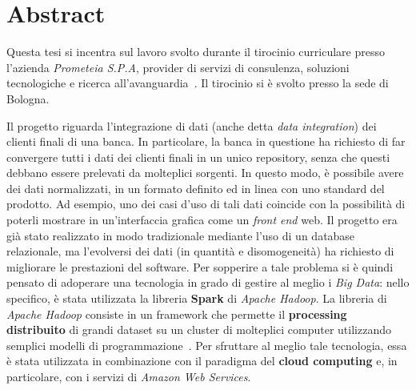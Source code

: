 \chapter*{Abstract}

Questa tesi si incentra sul lavoro svolto durante il tirocinio curriculare presso l'azienda \textit{Prometeia S.P.A}, provider di servizi di consulenza, soluzioni tecnologiche e ricerca all'avanguardia~\cite{Prometeia-aboutus}.
Il tirocinio si è svolto presso la sede di Bologna.

Il progetto riguarda l'integrazione di dati (anche detta \textit{data integration}) dei clienti finali di una banca.
In particolare, la banca in questione ha richiesto di far convergere tutti i dati dei clienti finali in un unico repository, senza che questi debbano essere prelevati da molteplici sorgenti.
In questo modo, è possibile avere dei dati normalizzati, in un formato definito ed in linea con uno standard del prodotto.
Ad esempio, uno dei casi d'uso di tali dati coincide con la possibilità di poterli mostrare in un'interfaccia grafica come un \textit{front end} web.
Il progetto era già stato realizzato in modo tradizionale mediante l'uso di un database relazionale, ma l'evolversi dei dati (in quantità e disomogeneità) ha richiesto di migliorare le prestazioni del software.
Per sopperire a tale problema si è quindi pensato di adoperare una tecnologia in grado di gestire al meglio i \textit{Big Data}: nello specifico, è stata utilizzata la libreria \textbf{Spark} di \textit{Apache Hadoop}.
La libreria di \textit{Apache Hadoop} consiste in un framework che permette il \textbf{processing distribuito} di grandi dataset su un cluster di molteplici computer utilizzando semplici modelli di programmazione~\cite{Apache-hadoop}.
Per sfruttare al meglio tale tecnologia, essa è stata utilizzata in combinazione con il paradigma del \textbf{cloud computing} e, in particolare, con i servizi di \textit{Amazon Web Services}.

\clearpage
